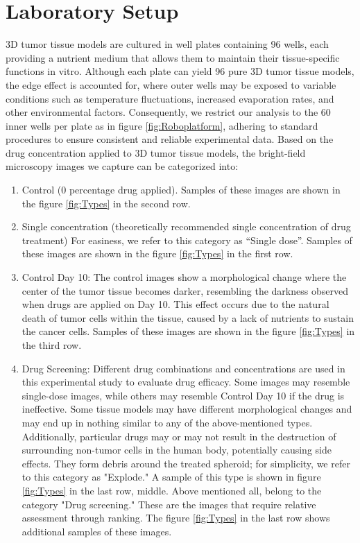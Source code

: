 \section{Laboratory Setup}
\label{sec:lab-setup}
3D tumor tissue models are cultured in well plates containing 96 wells, each providing a nutrient medium that allows them to maintain their tissue-specific functions in vitro. Although each plate can yield 96 pure 3D tumor tissue models, the edge effect is accounted for, where outer wells may be exposed to variable conditions such as temperature fluctuations, increased evaporation rates, and other environmental factors. Consequently, we restrict our analysis to the 60 inner wells per plate as in figure \ref{fig:Roboplatform}, adhering to standard procedures to ensure consistent and reliable experimental data. Based on the drug concentration applied to 3D tumor tissue models, the bright-field microscopy images we capture can be categorized into:

\begin{enumerate}[itemsep=0.5em, parsep=0pt] %
  \item Control (0 percentage drug applied). Samples of these images are shown in the figure \ref{fig:Types} in the second row.
  \item Single concentration (theoretically recommended single concentration of drug treatment) For easiness, we refer to this category as ``Single dose''. Samples of these images are shown in the figure \ref{fig:Types} in the first row.
  \item Control Day 10: The control images show a morphological change where the center of the tumor tissue becomes darker, resembling the darkness observed when drugs are applied on Day 10. This effect occurs due to the natural death of tumor cells within the tissue, caused by a lack of nutrients to sustain the cancer cells. Samples of these images are shown in the figure \ref{fig:Types} in the third row.
  \item Drug Screening: Different drug combinations and concentrations are used in this experimental study to evaluate drug efficacy. Some images may resemble single-dose images, while others may resemble Control Day 10 if the drug is ineffective. Some tissue models may have different morphological changes and may end up in nothing similar to any of the above-mentioned types. Additionally, particular drugs may or may not result in the destruction of surrounding non-tumor cells in the human body, potentially causing side effects. They form debris around the treated spheroid; for simplicity, we refer to this category as "Explode." A sample of this type is shown in figure \ref{fig:Types} in the last row, middle. Above mentioned all, belong to the category "Drug screening." These are the images that require relative assessment through ranking. The figure \ref{fig:Types} in the last row shows additional samples of these images.
\end{enumerate}



